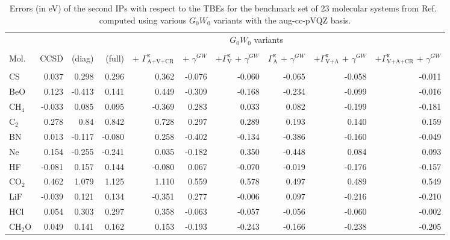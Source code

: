 \documentclass[aip,jcp,reprint,noshowkeys,superscriptaddress]{revtex4-2}
\newcommand{\fnm}{\footnotemark}
\begin{document}
\begin{squeezetable}
\begin{table}
\begin{ruledtabular}
	\caption{Errors (in \si{\eV}) of the second IPs with respect to the TBEs for the benchmark set of 23 molecular systems from Ref.~ computed using various $G_0W_0$ variants with the aug-cc-pVQZ basis.}
	\label{tab:ips_2}
	\begin{tabular}{l r r r r r r r r r}
		& & \multicolumn{8}{c}{$G_0W_0$ variants} \\
		\cline{3-10} \vspace{-0.2cm}\\ 
		Mol. & CCSD\fnm[1] & 
		(diag)\fnm[2] &
		(full) &
		+ $\Gamma^{\text{x}}_\text{A+V+CR}$ &
		+ $\gamma^{GW}$ &
		$+ \Gamma^{\text{x}}_\text{V}$ + $\gamma^{GW}$ &
		$\Gamma^{\text{x}}_\text{A}$ + $\gamma^{GW}$ &
		$+ \Gamma^{\text{x}}_\text{V+A}$ + $\gamma^{GW}$ &
		$+\Gamma^{\text{x}}_\text{V+A+CR}$ + $\gamma^{GW}$ \vspace{0.1cm}\\
		\cline{1-10}\vspace{-0.2cm}\\
		CS & 0.037 & 0.298 & 0.296 & 0.362 & -0.076 & -0.060 & -0.065 & -0.058 & -0.011 \\
		BeO & 0.123 & -0.413 & 0.141 & 0.449 & -0.309 & -0.168 & -0.234 & -0.099 & -0.016 \\
		CH$_4$ & -0.033 & 0.085 & 0.095 & -0.369 & 0.283 & 0.033 & 0.082 & -0.199 & -0.181 \\
		C$_2$ & 0.278 & 0.84 & 0.842 & 0.728 & 0.297 & 0.289 & 0.193 & 0.140 & 0.159 \\
		BN & 0.013 & -0.117 & -0.080 & 0.258 & -0.402 & -0.134 & -0.386 & -0.160 & -0.049 \\
		Ne & 0.154 & -0.255 & -0.241 & 0.035 & -0.182 & 0.350 & -0.448 & 0.084 & 0.093 \\
		HF & -0.081 & 0.157 & 0.144 & -0.080 & 0.067 & -0.070 & -0.019 & -0.176 & -0.157 \\
		CO$_2$ & 0.462 & 1.079 & 1.125 & 1.110 & 0.559 & 0.578 & 0.497 & 0.489 & 0.549 \\
		LiF & -0.039 & 0.121 & 0.134 & -0.351 & 0.277 & -0.006 & 0.097 & -0.216 & -0.210 \\
		HCl & 0.054 & 0.303 & 0.297 & 0.358 & -0.063 & -0.057 & -0.056 & -0.060 & -0.002 \\
		CH$_2$O & 0.049 & 0.141 & 0.162 & 0.153 & -0.193 & -0.243 & -0.166 & -0.238 & -0.205 \\

\end{tabular}
\end{ruledtabular}
\end{table}
\end{squeezetable}
\end{document}
